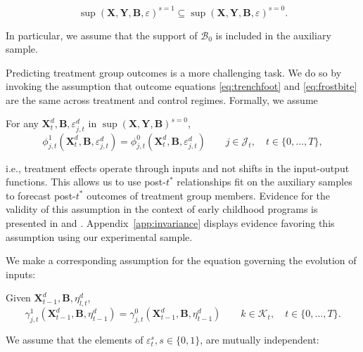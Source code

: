\begin{assumption} \label{ass:contain}
\begin{equation*}
\sup(\bm{X}, \bm{Y}, \bm{B}, \varepsilon)^{s=1} \subseteq \sup (\bm{X}, \bm{Y}, \bm{B}, \varepsilon)^{s=0}.
\end{equation*}
\end{assumption}
In particular, we assume that the support of $\mathcal{B}_0$ is included in the auxiliary sample.

Predicting treatment group outcomes is a more challenging task. We do so by invoking the assumption that outcome equations \eqref{eq:trenchfoot} and \eqref{eq:frostbite} are the same across treatment and control regimes. Formally, we assume

\renewcommand\theassumption{A--\arabic{assumption}(a)}
\begin{assumption}\label{ass:eczema}
For any $\bm{X}^d_t, \bm{B}, \varepsilon^d_{j,t}$ in $\sup(\bm{X},\bm{Y},\bm{B})^{s=0}$,
\begin{equation*}
\phi^1_{j,t} (\bm{X}^d_t, \bm{B}, \varepsilon^d_{j,t}) = \phi^0_{j,t} (\bm{X}^d_t, \bm{B}, \varepsilon^d_{j,t}) \qquad j \in \mathcal J_t, \quad t \in \{0,\dots,T\},
\end{equation*}
\end{assumption}
i.e., treatment effects operate through inputs and not shifts in the input-output functions. This allows us to use post-$t^*$ relationships fit on the auxiliary samples to forecast post-$t^*$ outcomes of treatment group members. Evidence for the validity of this assumption in the context of early childhood programs is presented in \citet{Heckman_Pinto_etal_2013_PerryFactor} and \citet{Attanasio-etal_2015_NBER_Estimating-Production}. Appendix~\ref{app:invariance} displays evidence favoring this assumption using our experimental sample.

We make a corresponding assumption for the equation governing the evolution of inputs:
\addtocounter{assumption}{-1}
\renewcommand\theassumption{A--\arabic{assumption}(b)}
\begin{assumption}\label{ass:psoriasis}
Given $\bm{X}^d_{t-1}, \bm{B}, \eta^d_{l,t}$,
\begin{equation*}
\gamma^1_{j,t} (\bm{X}^d_{t-1}, \bm{B}, \eta^d_{t-1}) = \gamma^0_{j,t} (\bm{X}^d_{t-1}, \bm{B}, \eta^d_{t-1}) \qquad k \in \mathcal{K}_t, \quad t \in \{0,\dots,T\}.
\end{equation*}
\end{assumption}
We assume that the elements of $\varepsilon_t^s, s \in \{0,1\}$, are mutually independent:

